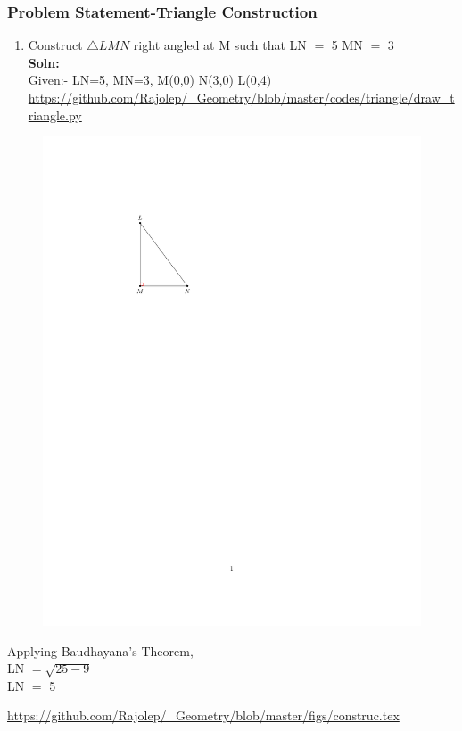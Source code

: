 \begin{frame}
\frametitle{Problem Statement-Triangle Construction}
\begin{enumerate}[label=(\roman*)]
\item Construct $\triangle LMN$ right angled at M such that LN $=$ 5  MN $=$ 3\\
\textbf{Soln:}\\
Given:- LN=5, MN=3, M(0,0) N(3,0) L(0,4) \\
\url{https://github.com/Rajolep/_Geometry/blob/master/codes/triangle/draw_triangle.py}
\end{enumerate}
\begin{figure}
\includegraphics[scale=0.4]{./figs/tricon.eps}
\end{figure}
\end{frame}
\begin{frame}
Applying Baudhayana's Theorem,\\
LN $= \sqrt{25-9}$\\
LN $=$ 5
\begin{figure}
\end{figure}
\url{https://github.com/Rajolep/_Geometry/blob/master/figs/construc.tex}
\end{frame}